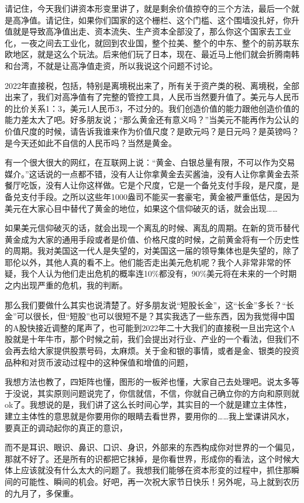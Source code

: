 \documentclass[UTF8, 12pt, a4paper]{ctexrep}
\begin{document}
请记住，今天我们讲资本形变里讲了，就是剩余价值掠夺的三个方法，最后一个就是高净值。请记住，如果你们国家的这个栅栏、这个门槛、这个围墙没扎好，你升值就是导致高净值出走、资本流失、生产资本全部没了，那么你这个国家去工业化，一夜之间去工业化，就回到农业国，整个拉美、整个的中东、整个的前苏联东欧地区，就是这么个玩法。后来他们玩了日本，现在、最近马上他们就会折腾南韩和台湾，不就是让高净值走资，所以我说这个问题不讨论。

2022年直接税，包括，特别是离境税出来了，所有关于资产类的税、离境税，全部出来了，我们对高净值有了完整的管控工具，人民币当然要升值了。美元与人民币的比价关系1：3，美元1人民币3，不过分的。我们创造价值的能力跟他创造价值的能力差太大了吧。好多朋友说；“那么黄金还有意义吗？”当美元不能再作为公认的价值尺度的时候，请告诉我谁来作为价值尺度？是欧元吗？是日元吗？是英镑吗？是今天还如此不自信的人民币吗？当然是黄金。

有一个很大很大的网红，在互联网上说：“黄金、白银总量有限，不可以作为交易媒介。”这话说的一点都不错，没有人让你拿黄金去买酱油，没有人让你拿黄金去茶餐厅吃饭，没有人让你这样做。它是个尺度，它是一个备兑支付手段，是尺度，是备兑支付手段。之所以这些年1000盎司不能买一套豪宅，黄金被严重低估，是因为美元在大家心目中替代了黄金的地位，如果这个信仰破灭的话，就会出现……

如果美元信仰破灭的话，就会出现一个离乱的时候、离乱的周期。在新的货币替代黄金成为大家的通用手段或者是价值、价格尺度的时候，之前黄金将有一个历史性的周期。我对美国这一代人是失望的，对美国这一届的领导集体也是失望的，除了耶伦以外，其他人真的看不上。他们能否走出美元危机呢？我个人非常非常的怀疑，我个人认为他们走出危机的概率连10\%都没有，90\%美元将在未来的一个时期之内出现严重的危机，我的判断。

那么我们要做什么其实也说清楚了。好多朋友说“短股长金”，这“长金”多长？“长金”可以很长，但“短股”也可以很短不是？其实我选了一些东西，因为我觉得中国的A股快接近调整的尾声了，也可能到2022年二十大我们的直接税一旦出完这个A股就是十年牛市，那个时候之前，我们会提出对行业、产业的一个看法，但我们不会再去给大家提供股票号码，太麻烦。关于金和银的事情，或者是金、银类的投资品种和对货币波动过程中的这种保值和增值的问题，

我想方法也教了，四矩阵也懂，图形的一板斧也懂，大家自己去处理吧。说太多等于没说，其实原则问题说完了，你信就信，不信，你就自己确立你的方向和原则就ok了。我想说的是，我们讲了这么长时间心学，其实目的一个就是建立主体性，建立主体性的意思就是你要用你的眼睛去看世界，要用你的……我上堂课讲风水，要真正的调动起你的真正的意识，

而不是耳识、眼识、鼻识、口识、身识，外部来的东西构成你对世界的一个偏见，那就不好了。还是所有的识都把它抹掉，是你看世界，形成你的看法，这个时候大体上应该就没有什么太大的问题了。我想我们能够在资本形变的过程中，抓住那瞬间的可能性、瞬间的机会。好吧，再一次祝大家节日快乐！另外呢，马上就到农历的九月了，多保重。
\end{document}
